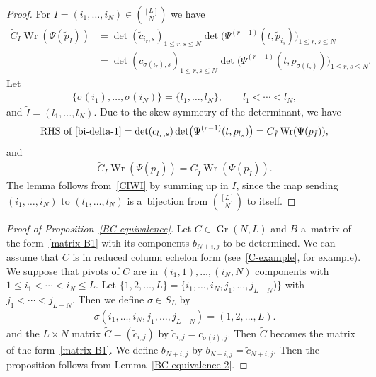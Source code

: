 \documentclass[pdftex]{sigma}
\numberwithin{equation}{section}
\theoremstyle{definition}
\begin{document}
\begin{proof}
For $I=(i_1,\dots ,i_N)\in\binom{[L]}{N}$ we have
\begin{align}
\tilde{C}_I\operatorname{Wr}(\Psi(\tilde{p}_I))
&=
\det(\tilde{c}_{i_r,s})_{1\leq r,s\leq N}
\det\bigl(\Psi^{(r-1)}(t,\tilde{p}_{i_s})\bigr)_{1\leq r,s\leq N}
\nonumber
\\
&=
\det(c_{\sigma(i_r),s})_{1\leq r,s\leq N}
\det\bigl(\Psi^{(r-1)}(t,p_{\sigma(i_s)})\bigr)_{1\leq r,s\leq N}.
\label{bi-delta-1}
\end{align}
Let
\begin{gather*}
\{\sigma(i_1),\dots ,\sigma(i_N)\}=\{l_1,\dots ,l_N\},
\qquad
l_1<\cdots<l_N,
\end{gather*}
 and $\tilde{I}=(l_1,\dots ,l_N)$.
Due to the skew symmetry of the determinant, we have
\[%
\text{RHS of~\eqref{bi-delta-1}}
=
\det(c_{l_r,s})
\det\bigl(\Psi^{(r-1)}(t,{p}_{l_s})\bigr)
=
C_{\tilde{I}}
\operatorname{Wr}(\Psi(p_{\tilde{I}})),
\]
and
\begin{gather}
\tilde{C}_I\operatorname{Wr}(\Psi(p_I))=C_{\tilde{I}}
\operatorname{Wr}(\Psi(p_{\tilde{I}})).
\label{CIWI}
\end{gather}
The lemma follows from~\eqref{CIWI} by summing up in $I$,
since the map sending $(i_1,\dots ,i_N)$ to $(l_1,\dots ,l_N)$ is a~bijection from $\binom{[L]}{N}$ to itself.
\end{proof}



\begin{proof}[Proof of Proposition~\ref{BC-equivalence}]

Let $C\in \operatorname{Gr}(N,L)$ and $B$ a~matrix of the form~\eqref{matrix-B1} with
its components $b_{N+i,j}$ to be determined.
We can assume that $C$ is in reduced column echelon form
(see~\eqref{C-example}, for example).
We suppose that pivots of $C$ are in $(i_1,1),\dots ,(i_N,N)$ components with
$1\leq i_1<\cdots<i_N\leq L$.
Let $\{1,2,\dots ,L\}=\{i_1,\dots ,i_N,j_1,\dots ,j_{L-N})\}$ with $j_1<\cdots<j_{L-N}$.
Then we define $\sigma\in S_L$ by
\begin{gather*}
\sigma(i_1,\dots ,i_N,j_1,\dots ,j_{L-N})=(1,2,\dots ,L).
\end{gather*}
and the $L\times N$ matrix $\tilde{C}=(\tilde{c}_{i,j})$ by
$
\tilde{c}_{i,j}=c_{\sigma(i),j}$.
Then $\tilde{C}$ becomes the matrix of the form~\eqref{matrix-B1}.
We define $b_{N+i,j}$ by
$
b_{N+i,j}=\tilde{c}_{N+i,j}$.
Then the proposition follows from Lemma~\ref{BC-equivalence-2}.
\end{proof}
\end{document}
